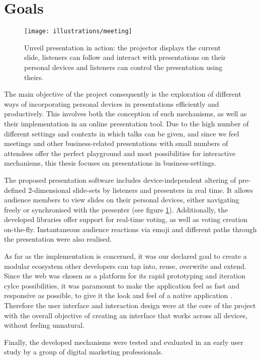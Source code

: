 \section{Goals}

\begin{figure}
\centering
\texttt{[image: illustrations/meeting]}
\caption{Unveil presentation in action: the projector displays the current slide, listeners can follow and interact with presentations on their personal devices and listeners can control the presentation using theirs.}
\label{fig:introduction-meeting}
\end{figure}

The main objective of the project consequently is the exploration of different ways of incorporating personal devices in presentations efficiently and productively. This involves both the conception of such mechanisms, as well as their implementation in an online presentation tool.
Due to the high number of different settings and contexts in which talks can be given, and since we feel meetings and other business-related presentations with small numbers of attendees offer the perfect playground and most possibilities for interactive mechanisms, this thesis focuses on presentations in business-settings.

The proposed presentation software includes device-independent altering of pre-defined $2$-dimensional slide-sets by listeners and presenters in real time. It allows audience members to view slides on their personal devices, either navigating freely or synchronised with the presenter (see figure \ref{fig:introduction-meeting}). Additionally, the developed libraries offer support for real-time voting, as well as voting creation on-the-fly. Instantaneous audience reactions via emoji and different paths through the presentation were also realised.

As far as the implementation is concerned, it was our declared goal to create a modular ecosystem other developers can tap into, reuse, overwrite and extend. Since the web was chosen as a platform for its rapid prototyping and iteration cylce possibilities, it was paramount to make the application feel as fast and responsive as possible, to give it the look and feel of a native application \cite{Charland:WebVsNative}. Therefore the user interface and interaction design were at the core of the project with the overall objective of creating an interface that works across all devices, without feeling unnatural.

Finally, the developed mechanisms were tested and evaluated in an early user study by a group of digital marketing professionals.

